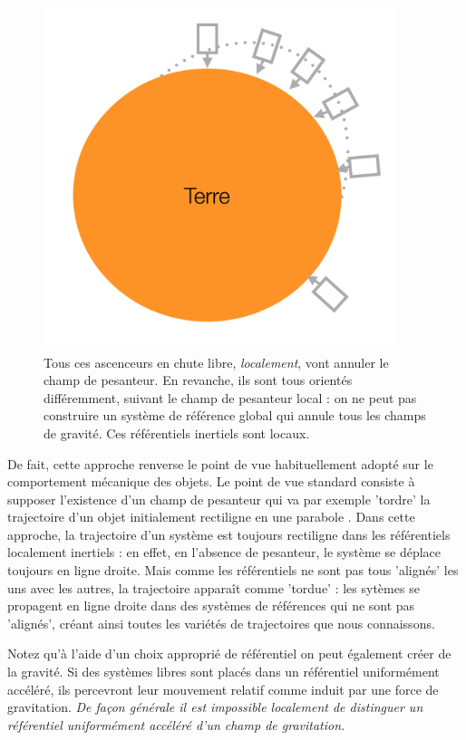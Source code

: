 \begin{figure}[htbp]
	\centering
		\includegraphics[height=10cm]{figs/ascradial.png}
	\caption[Réferentiels localement inertiels]{Tous ces ascenceurs en chute libre, \textit{localement}, vont annuler le champ de pesanteur. En revanche, ils sont tous orientés différemment, suivant le champ de pesanteur local : on ne peut pas construire un système de référence global qui annule tous les champs de gravité. Ces référentiels inertiels sont locaux.}
	\label{f:ascradial}
\end{figure}

De fait, cette approche renverse le point de vue habituellement adopté sur le comportement mécanique des objets. Le point de vue standard consiste à supposer l'existence d'un champ de pesanteur qui va par exemple 'tordre' la trajectoire d'un objet initialement rectiligne en une parabole . Dans cette approche, la trajectoire d'un système est toujours rectiligne dans les référentiels localement inertiels : en effet, en l'absence de pesanteur, le système se déplace toujours en ligne droite. Mais comme les référentiels ne sont pas tous 'alignés' les uns avec les autres, la trajectoire apparaît comme 'tordue' : les sytèmes se propagent en ligne droite dans des systèmes de références qui ne sont pas 'alignés', créant ainsi toutes les variétés de trajectoires que nous connaissons. 


Notez qu'à l'aide d'un choix approprié de référentiel on peut également créer de la gravité. Si des systèmes libres sont placés dans un référentiel uniformément accéléré, ils percevront leur mouvement relatif comme induit par une force de gravitation. \textit{De façon générale il est impossible localement de distinguer un référentiel uniformément accéléré d'un champ de gravitation.}


